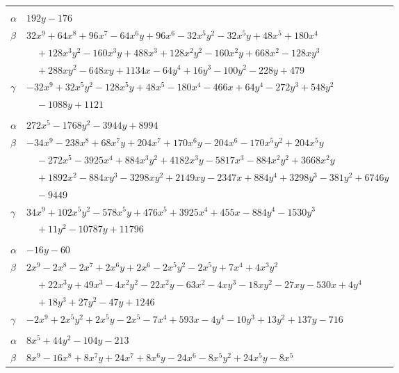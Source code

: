 \documentclass[11pt]{article}
\begin{document}
\begin{longtable}{@{}ll@{}}
\addlinespace[3pt]
\multicolumn{2}{@{}l}{$\{i,j\}=\{22,33\}$, $k_{ij}=3^{3}\cdot 5\cdot 7$}\\
$\alpha$ & $192y-176$\\
$\beta$ & $32x^{9}+64x^{8}+96x^{7}-64x^{6}y+96x^{6}-32x^{5}y^{2}-32x^{5}y+48x^{5}+180x^{4}$\\
 & $\quad +128x^{3}y^{2}-160x^{3}y+488x^{3}+128x^{2}y^{2}-160x^{2}y+668x^{2}-128xy^{3}$\\
 & $\quad +288xy^{2}-648xy+1134x-64y^{4}+16y^{3}-100y^{2}-228y+479$\\
$\gamma$ & $-32x^{9}+32x^{5}y^{2}-128x^{5}y+48x^{5}-180x^{4}-466x+64y^{4}-272y^{3}+548y^{2}$\\
 & $\quad -1088y+1121$\\
\addlinespace[3pt]
\multicolumn{2}{@{}l}{$\{i,j\}=\{23,26\}$, $k_{ij}=2\cdot 3^{3}\cdot 5\cdot 7\cdot 11$}\\
$\alpha$ & $272x^{5}-1768y^{2}-3944y+8994$\\
$\beta$ & $-34x^{9}-238x^{8}+68x^{7}y+204x^{7}+170x^{6}y-204x^{6}-170x^{5}y^{2}+204x^{5}y$\\
 & $\quad -272x^{5}-3925x^{4}+884x^{3}y^{2}+4182x^{3}y-5817x^{3}-884x^{2}y^{2}+3668x^{2}y$\\
 & $\quad +1892x^{2}-884xy^{3}-3298xy^{2}+2149xy-2347x+884y^{4}+3298y^{3}-381y^{2}+6746y$\\
 & $\quad -9449$\\
$\gamma$ & $34x^{9}+102x^{5}y^{2}-578x^{5}y+476x^{5}+3925x^{4}+455x-884y^{4}-1530y^{3}$\\
 & $\quad +11y^{2}-10787y+11796$\\
\addlinespace[3pt]
\multicolumn{2}{@{}l}{$\{i,j\}=\{23,31\}$, $k_{ij}=2^{2}\cdot 7^{3}$}\\
$\alpha$ & $-16y-60$\\
$\beta$ & $2x^{9}-2x^{8}-2x^{7}+2x^{6}y+2x^{6}-2x^{5}y^{2}-2x^{5}y+7x^{4}+4x^{3}y^{2}$\\
 & $\quad +22x^{3}y+49x^{3}-4x^{2}y^{2}-22x^{2}y-63x^{2}-4xy^{3}-18xy^{2}-27xy-530x+4y^{4}$\\
 & $\quad +18y^{3}+27y^{2}-47y+1246$\\
$\gamma$ & $-2x^{9}+2x^{5}y^{2}+2x^{5}y-2x^{5}-7x^{4}+593x-4y^{4}-10y^{3}+13y^{2}+137y-716$\\
\addlinespace[3pt]
\multicolumn{2}{@{}l}{$\{i,j\}=\{23,42\}$, $k_{ij}=3^{2}\cdot 17$}\\
$\alpha$ & $8x^{5}+44y^{2}-104y-213$\\
$\beta$ & $8x^{9}-16x^{8}+8x^{7}y+24x^{7}+8x^{6}y-24x^{6}-8x^{5}y^{2}+24x^{5}y-8x^{5}$\\

\end{longtable}
\end{document}
